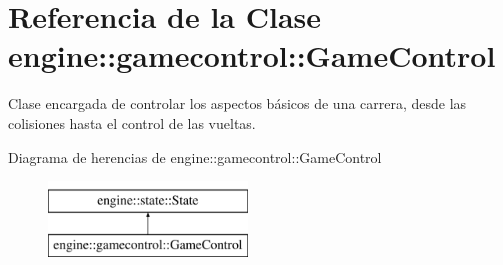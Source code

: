 \hypertarget{classengine_1_1gamecontrol_1_1GameControl}{
\section{\-Referencia de la \-Clase engine\-:\-:gamecontrol\-:\-:\-Game\-Control}
\label{classengine_1_1gamecontrol_1_1GameControl}
}


\-Clase encargada de controlar los aspectos básicos de una carrera, desde las colisiones hasta el control de las vueltas.  


\-Diagrama de herencias de engine\-:\-:gamecontrol\-:\-:\-Game\-Control\begin{figure}[H]
\begin{center}
\leavevmode
\includegraphics[height=2.000000cm]{classengine_1_1gamecontrol_1_1GameControl}
\end{center}
\end{figure}
